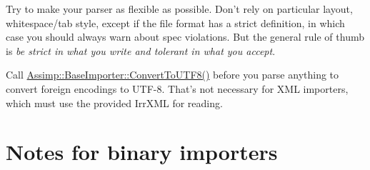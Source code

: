 \begin{DoxyItemize}
\item Try to make your parser as flexible as possible. Don't rely on particular layout, whitespace/tab style, except if the file format has a strict definition, in which case you should always warn about spec violations. But the general rule of thumb is {\itshape be strict in what you write and tolerant in what you accept}. 
\item Call \hyperlink{class_assimp_1_1_base_importer_a3cd8c81533de987dd7acea6874ad918c}{Assimp\+::\+Base\+Importer\+::\+Convert\+To\+U\+T\+F8()} before you parse anything to convert foreign encodings to U\+T\+F-\/8. That's not necessary for X\+M\+L importers, which must use the provided Irr\+X\+M\+L for reading.  
\end{DoxyItemize}\hypertarget{extend_bnote}{}\section{Notes for binary importers}\label{extend_bnote}

